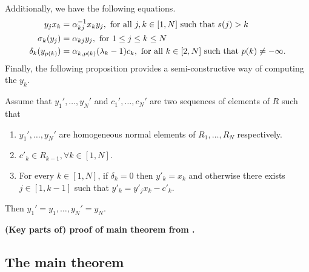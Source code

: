 Additionally, we have the following equations.
\begin{align}\label{eq:y_x_quasi_commute}
	y_j x_k            & = \alpha_{kj}^{-1} x_k y_j, \text{ for all } j, k \in [1, N] \text{ such that } s(j) > k                                             \\
	\sigma_k (y_j)     & = \alpha_{kj}y_j, \text{ for } 1 \leq j \leq k \leq N \label{eq:sigma_of_y}                                                         \\
	\delta_k(y_{p(k)}) & = \alpha_{k, p(k)}(\lambda_k - 1)c_k, \text{ for all } k \in [2, N] \text{ such that } p(k) \neq - \infty \label{eq:delta_of_y_pk}.
\end{align}
%
Finally, the following proposition provides a semi-constructive way of computing the
$y_k$.
\begin{proposition}
	Assume that $y_1', \dots, y_N'$ and $c_1',\dots, c_N'$ are two sequences of elements of $R$ such that
	\begin{enumerate}
		\item $y_1', \dots, y_N'$ are homogeneous normal elements of $R_1, \dots, R_N$ respectively.
		\item $c'_k \in R_{k-1}, \forall k \in [1, N]$.
		\item For every $k \in [1, N]$, if $\delta_k = 0$ then $y'_k = x_k$ and otherwise there
		      exists $j \in [1, k-1]$ such that $y'_k = y'_j x_k - c'_k$.
	\end{enumerate}
	Then $y_1' = y_1, \dots, y_N' = y_N$.
\end{proposition}

\textbf{(Key parts of) proof of main theorem from \cite{GoodearlYakimov2017QCA}.}

\subsection{The main theorem}

